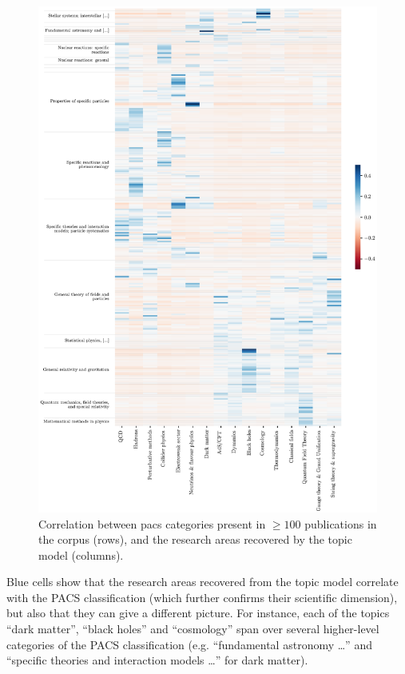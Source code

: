 \documentclass{article}
\begin{document}
\begin{figure}[H]
    \centering
    \includegraphics[height=0.73\paperheight
]{plots/Fig11.eps}
    \caption{Correlation between \gls{pacs} categories present in $\geq 100$ publications in the corpus (rows), and the research areas recovered by the topic model (columns).}
\end{figure}

Blue cells show that the research areas recovered from the topic model correlate with the PACS classification (which further confirms their scientific dimension), but also that they can give a different picture. For instance, each of the topics  ``dark matter'', ``black holes'' and ``cosmology'' span over several higher-level categories of the PACS classification (e.g. ``fundamental astronomy \dots'' and ``specific theories and interaction models \dots'' for dark matter).
\end{document}

